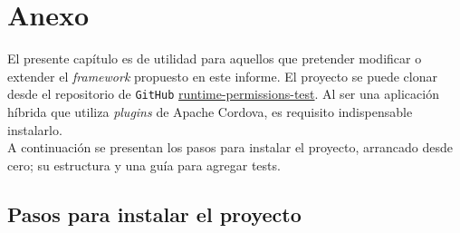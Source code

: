 \chapter*{Anexo}
El presente capítulo es de utilidad para aquellos que pretender modificar o extender el \emph{framework} propuesto en este informe. El proyecto se puede clonar desde el repositorio de \texttt{GitHub} \href{https://github.com/rgaluppo/runtime_permissions_test}{runtime-permissions-test}. Al ser una aplicación híbrida que utiliza \emph{plugins} de Apache Cordova, es requisito indispensable instalarlo.\\

A continuación se presentan los pasos para instalar el proyecto, arrancado desde cero; su estructura y una guía para agregar tests.
\section*{Pasos para instalar el proyecto}
